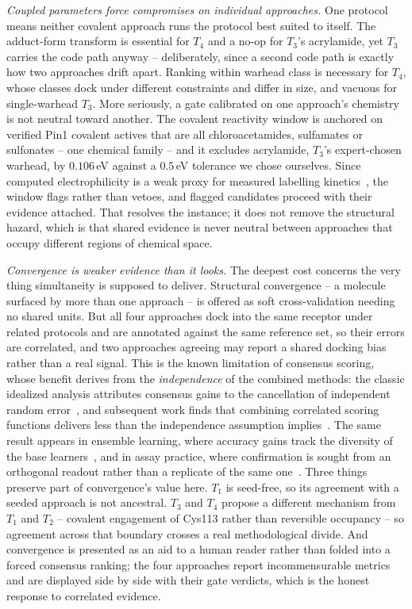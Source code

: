 \emph{Coupled parameters force compromises on individual approaches.}
One protocol means neither covalent approach runs the protocol best
suited to itself.
The adduct-form transform is essential for $T_4$ and a no-op for $T_3$'s
acrylamide, yet $T_3$ carries the code path anyway -- deliberately,
since a second code path is exactly how two approaches drift apart.
Ranking within warhead class is necessary for $T_4$, whose classes dock
under different constraints and differ in size, and vacuous for
single-warhead $T_3$.
More seriously, a gate calibrated on one approach's chemistry is not
neutral toward another.
The covalent reactivity window is anchored on verified Pin1 covalent
actives that are all chloroacetamides, sulfamates or sulfonates -- one
chemical family -- and it excludes acrylamide, $T_3$'s expert-chosen
warhead, by $0.106$\,eV against a $0.5$\,eV tolerance we chose
ourselves.
Since computed electrophilicity is a weak proxy for measured labelling
kinetics~\cite{flanagan_chemical_2014}, the window flags rather than
vetoes, and flagged candidates proceed with their evidence attached.
That resolves the instance; it does not remove the structural hazard,
which is that shared evidence is never neutral between approaches that
occupy different regions of chemical space.

\emph{Convergence is weaker evidence than it looks.}
The deepest cost concerns the very thing simultaneity is supposed to
deliver.
Structural convergence -- a molecule surfaced by more than one approach
-- is offered as soft cross-validation needing no shared units.
But all four approaches dock into the same receptor under related
protocols and are annotated against the same reference set, so their
errors are correlated, and two approaches agreeing may report a shared
docking bias rather than a real signal.
This is the known limitation of consensus scoring, whose benefit derives
from the \emph{independence} of the combined methods: the classic
idealized analysis attributes consensus gains to the cancellation of
independent random error~\cite{wang_how_2001,charifson_consensus_1999},
and subsequent work finds that combining correlated scoring functions
delivers less than the independence assumption
implies~\cite{feher_consensus_2006,oda_comparison_2006,houston_consensus_2013}.
The same result appears in ensemble learning, where accuracy gains track
the diversity of the base
learners~\cite{dietterich_ensemble_2000,kuncheva_measures_2003}, and in
assay practice, where confirmation is sought from an orthogonal readout
rather than a replicate of the same
one~\cite{thorne_apparent_2010}.
Three things preserve part of convergence's value here.
$T_1$ is seed-free, so its agreement with a seeded approach is not
ancestral.
$T_3$ and $T_4$ propose a different mechanism from $T_1$ and $T_2$ --
covalent engagement of Cys113 rather than reversible occupancy -- so
agreement across that boundary crosses a real methodological divide.
And convergence is presented as an aid to a human reader rather than
folded into a forced consensus ranking; the four approaches report
incommensurable metrics and are displayed side by side with their gate
verdicts, which is the honest response to correlated evidence.

